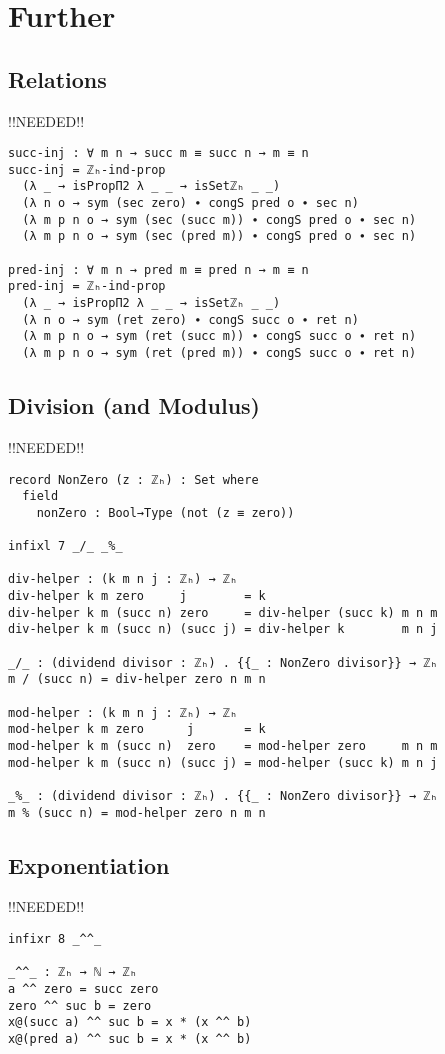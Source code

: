 \chapter{Further}
\label{ch:further}

\section{Relations}
!!NEEDED!!
\begin{verbatim}
succ-inj : ∀ m n → succ m ≡ succ n → m ≡ n
succ-inj = ℤₕ-ind-prop
  (λ _ → isPropΠ2 λ _ _ → isSetℤₕ _ _)
  (λ n o → sym (sec zero) ∙ congS pred o ∙ sec n)
  (λ m p n o → sym (sec (succ m)) ∙ congS pred o ∙ sec n)
  (λ m p n o → sym (sec (pred m)) ∙ congS pred o ∙ sec n)

pred-inj : ∀ m n → pred m ≡ pred n → m ≡ n
pred-inj = ℤₕ-ind-prop
  (λ _ → isPropΠ2 λ _ _ → isSetℤₕ _ _)
  (λ n o → sym (ret zero) ∙ congS succ o ∙ ret n)
  (λ m p n o → sym (ret (succ m)) ∙ congS succ o ∙ ret n)
  (λ m p n o → sym (ret (pred m)) ∙ congS succ o ∙ ret n)
\end{verbatim}

\section{Division (and Modulus)}
!!NEEDED!!
\begin{verbatim}
record NonZero (z : ℤₕ) : Set where
  field
    nonZero : Bool→Type (not (z ≡ zero))

infixl 7 _/_ _%_

div-helper : (k m n j : ℤₕ) → ℤₕ
div-helper k m zero     j        = k
div-helper k m (succ n) zero     = div-helper (succ k) m n m
div-helper k m (succ n) (succ j) = div-helper k        m n j

_/_ : (dividend divisor : ℤₕ) . {{_ : NonZero divisor}} → ℤₕ
m / (succ n) = div-helper zero n m n

mod-helper : (k m n j : ℤₕ) → ℤₕ
mod-helper k m zero      j       = k
mod-helper k m (succ n)  zero    = mod-helper zero     m n m
mod-helper k m (succ n) (succ j) = mod-helper (succ k) m n j

_%_ : (dividend divisor : ℤₕ) . {{_ : NonZero divisor}} → ℤₕ
m % (succ n) = mod-helper zero n m n
\end{verbatim}

\section{Exponentiation}
!!NEEDED!!
\begin{verbatim}
infixr 8 _^^_

_^^_ : ℤₕ → ℕ → ℤₕ
a ^^ zero = succ zero
zero ^^ suc b = zero
x@(succ a) ^^ suc b = x * (x ^^ b)
x@(pred a) ^^ suc b = x * (x ^^ b)
\end{verbatim}

